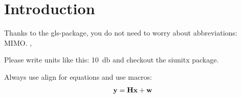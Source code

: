 \section{Introduction}
Thanks to the gls-package, you do not need to worry about abbreviations: \gls{MIMO}. 
\cite{dorner2017deep}, \cite{farsad2018text}

Please write units like this: \SI{10}{\decibel} and checkout the siunitx package.

Always use align for equations and use macros:
\begin{align}
\mathbf{y} = \mathbf{H}\mathbf{x} + \mathbf{w}
\end{align}